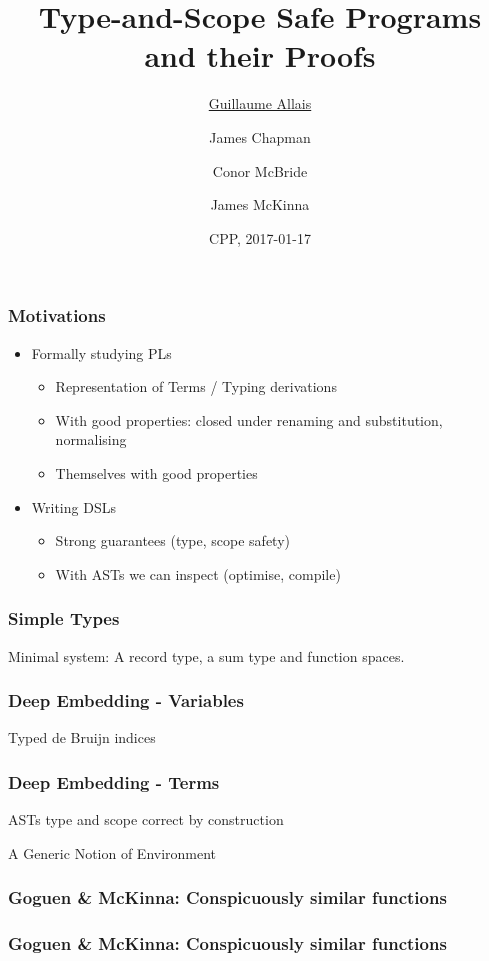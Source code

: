 \documentclass[xetex, mathserif, serif]{beamer}
\title{Type-and-Scope Safe Programs and their Proofs}
\author[me]{\underline{Guillaume Allais} \and James Chapman \and Conor McBride \and James McKinna}
\institute{}
\date{CPP, 2017-01-17}
\begin{document}
 
  \begin{frame}
    \titlepage
  \end{frame}

  \begin{frame}\frametitle{Motivations}
    \begin{itemize}
      \item Formally studying PLs
      \begin{itemize}
        \item Representation of Terms / Typing derivations
        \item With good properties: closed under renaming and substitution, normalising
        \item Themselves with good properties
      \end{itemize}
      \item Writing DSLs
      \begin{itemize}
        \item Strong guarantees (type, scope safety)
        \item With ASTs we can inspect (optimise, compile)
      \end{itemize}  
    \end{itemize}
  \end{frame}
  
  \begin{frame}\frametitle{Simple Types}
    Minimal system: A record type, a sum type and function spaces.

    \unskip
    \unskip
  \end{frame}

  \begin{frame}\frametitle{Deep Embedding - Variables}
    Typed de Bruijn indices

    \unskip
  \end{frame}
  \begin{frame}\frametitle{Deep Embedding - Terms}
    ASTs type and scope correct by construction

    \unskip
  \end{frame}

  \begin{frame}{A Generic Notion of Environment}
    \unskip
  \end{frame}

  \begin{frame}\frametitle{Goguen \& McKinna: Conspicuously similar functions}
  \end{frame}
  \begin{frame}\frametitle{Goguen \& McKinna: Conspicuously similar functions}
  \end{frame}
\end{document}
